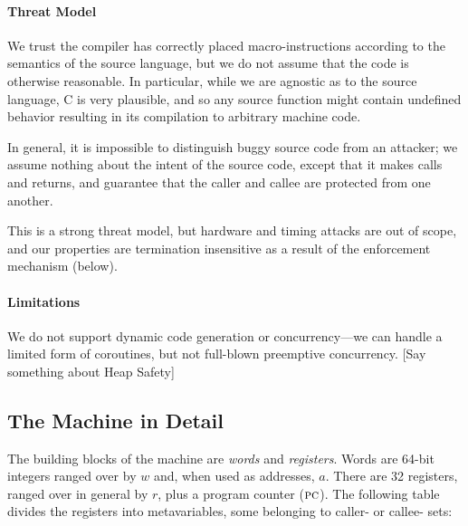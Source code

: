 \documentclass[10pt,conference]{ieeetran}%
\theoremstyle{definition}
\begin{document}

\paragraph*{Threat Model}

We trust the compiler has correctly placed macro-instructions according to
the semantics of the source language, but we do not assume that the code
is otherwise reasonable. In particular, while we are agnostic as to the source
language, C is very plausible, and so any source function might contain undefined
behavior resulting in its compilation to arbitrary machine code.

In general, it is impossible to distinguish buggy source code from an attacker;
we assume nothing about the intent of the source code, except that it makes calls
and returns, and guarantee that the caller and callee are protected from one
another.

This is a strong threat model, but hardware and timing attacks are out of scope,
and our properties are termination insensitive as a result of the enforcement mechanism
(below).

\paragraph*{Limitations}

We do not support dynamic code generation or concurrency---we can handle a
limited form of coroutines, but not full-blown preemptive concurrency.
[Say something about Heap Safety]

\subsection{The Machine in Detail}
\label{sec:prelim}

The building blocks of the machine are {\em words} and {\em registers}.
Words are 64-bit integers ranged over by \(w\) and, when used as addresses,
\(a\). There are 32 registers, ranged over in general by \(r\),
plus a program counter (\(\textsc{pc}\)). The following table divides
the registers into metavariables, some belonging to caller- or callee- sets:
\end{document}
